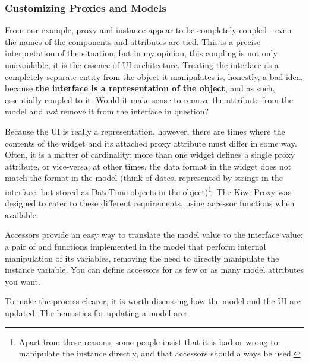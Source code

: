 \documentclass[a4paper]{howto}
\begin{document}
\subsubsection{Customizing Proxies and Models}

From our example, proxy and instance appear to be completely coupled -
even the names of the components and attributes are tied. This is a
precise interpretation of the situation, but in my opinion, this
coupling is not only unavoidable, it is the essence of UI architecture.
Treating the interface as a completely separate entity from the object
it manipulates is, honestly, a bad idea, because {\bf the interface is a
representation of the object}, and as such, essentially coupled to it.
Would it make sense to remove the  attribute from the model
and {\it not} remove it from the interface in question?

Because the UI is really a representation, however, there are times
where the contents of the widget and its attached proxy attribute must
differ in some way. Often, it is a matter of cardinality: more than one
widget defines a single proxy attribute, or vice-versa; at other times,
the data format in the widget does not match the format in the model
(think of dates, represented by strings in the interface, but stored as
DateTime objects in the object)\footnote{ Apart from these reasons, some
people insist that it is bad or wrong to manipulate the instance
directly, and that accessors should always be used.}. The Kiwi Proxy was
designed to cater to these different requirements, using accessor
functions when available.

Accessors provide an easy way to translate the model value to the
interface value: a pair of  and  functions
implemented in the model that perform internal manipulation of its
variables, removing the need to directly manipulate the instance
variable. You can define accessors for as few or as many model
attributes you want.

To make the process clearer, it is worth discussing how the model and
the UI are updated. The heuristics for updating a model are:
\end{document}
